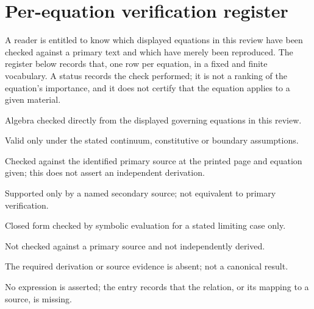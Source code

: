 \section{Per-equation verification register}\label{sec:eqregister}

A reader is entitled to know which displayed equations in this review have been checked against a
primary text and which have merely been reproduced. The register below records that, one row per
equation, in a fixed and finite vocabulary. A status records the check performed; it is not a
ranking of the equation's importance, and it does not certify that the equation applies to a given
material.

\begin{description}[leftmargin=1.6em,style=nextline]
\item[DERIVED] Algebra checked directly from the displayed governing equations in this review.
\item[CONDITIONAL] Valid only under the stated continuum, constitutive or boundary assumptions.
\item[PRIMARY-SOURCE-CHECKED] Checked against the identified primary source at the printed page and
  equation given; this does not assert an independent derivation.
\item[SECONDARY-SOURCE] Supported only by a named secondary source; not equivalent to primary verification.
\item[VERIFIED-SYMBOLIC] Closed form checked by symbolic evaluation for a stated limiting case only.
\item[UNVERIFIED] Not checked against a primary source and not independently derived.
\item[OPEN] The required derivation or source evidence is absent; not a canonical result.
\item[WITHHELD] No expression is asserted; the entry records that the relation, or its mapping to a
  source, is missing.
\end{description}

